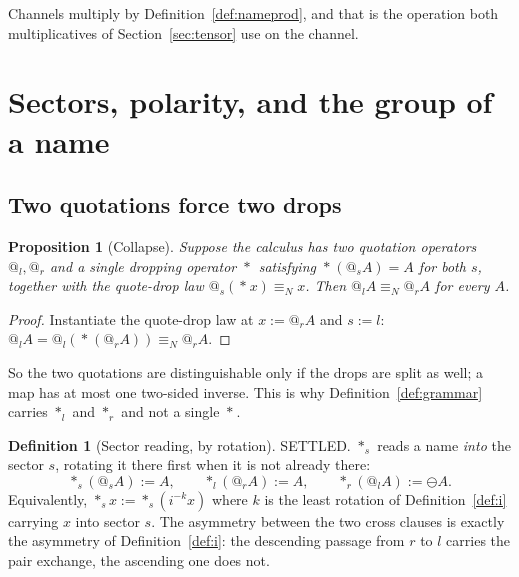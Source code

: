 \documentclass[11pt]{article}
\makeatletter
\newtheorem{proposition}[theorem]{Proposition}
\theoremstyle{definition}
\newtheorem{definition}[theorem]{Definition}
\theoremstyle{remark}
\newcommand{\quo}[1]{\ensuremath{@_{#1}}}
\newcommand{\drp}[1]{\ensuremath{*_{#1}}}
\newcommand{\negop}{\ensuremath{\ominus}}
\newcommand{\nameq}{\ensuremath{\equiv_{N}}}
\makeatother
\begin{document}
Channels multiply by Definition~\ref{def:nameprod}, and that is the operation
both multiplicatives of Section~\ref{sec:tensor} use on the channel.

\section{Sectors, polarity, and the group of a name}
\label{sec:group}

\subsection{Two quotations force two drops}

\begin{proposition}[Collapse]
\label{prop:collapse}
Suppose the calculus has two quotation operators $\quo{l}, \quo{r}$ and a
\emph{single} dropping operator $\drp{}$ satisfying $\drp{}(\quo{s}A) = A$ for
both $s$, together with the quote-drop law $\quo{s}(\drp{}x) \nameq x$. Then
$\quo{l}A \nameq \quo{r}A$ for every $A$.
\end{proposition}

\begin{proof}
Instantiate the quote-drop law at $x := \quo{r}A$ and $s := l$:
$\quo{l}A = \quo{l}(\drp{}(\quo{r}A)) \nameq \quo{r}A$.
\end{proof}

So the two quotations are distinguishable only if the drops are split as well;
a map has at most one two-sided inverse. This is why
Definition~\ref{def:grammar} carries $\drp{l}$ and $\drp{r}$ and not a single
$\drp{}$.

\begin{definition}[Sector reading, by rotation]
\label{def:proj}
SETTLED. $\drp{s}$ reads a name \emph{into} the sector $s$, rotating it there
first when it is not already there:
\[
  \drp{s}(\quo{s}A) := A, \qquad
  \drp{l}(\quo{r}A) := A, \qquad
  \drp{r}(\quo{l}A) := \negop A .
\]
Equivalently, $\drp{s}x := \drp{s}(i^{-k}x)$ where $k$ is the least rotation of
Definition~\ref{def:i} carrying $x$ into sector $s$. The asymmetry between the
two cross clauses is exactly the asymmetry of Definition~\ref{def:i}: the
descending passage from $r$ to $l$ carries the pair exchange, the ascending one
does not.
\end{definition}
\end{document}
